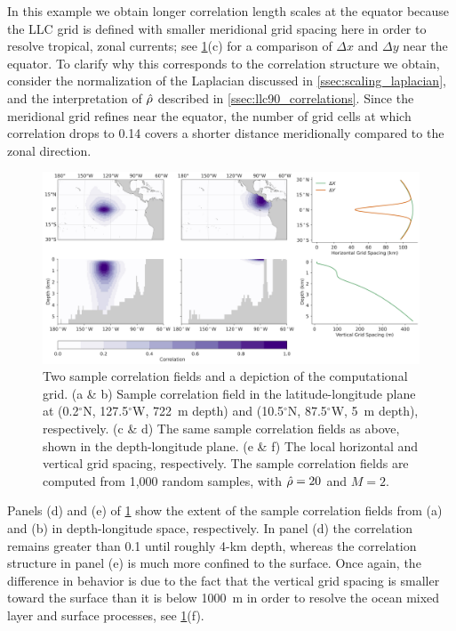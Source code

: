 In this example we obtain longer correlation length scales at the equator
because the LLC grid is defined with smaller meridional grid spacing here in
order to resolve tropical, zonal currents;
see \cref{fig:llc90_correlation_maps}(c) for a comparison of $\Delta x $ and
$\Delta y$ near the equator.
To clarify why this corresponds to the correlation structure we obtain,
consider the normalization of the Laplacian discussed in
\cref{ssec:scaling_laplacian}, and the interpretation of $\hat{\rho}$ described
in \cref{ssec:llc90_correlations}.
Since the meridional grid refines near the equator, the number of grid cells at
which correlation drops to 0.14 covers a shorter distance meridionally compared
to the zonal direction.

\begin{figure}
    \centering
    \includegraphics[width=\textwidth]{../figures/huge_correlation_map_02apps.jpg}
    \caption{Two sample correlation fields and a depiction of the computational
        grid.
        (a \& b) Sample correlation field in the latitude-longitude plane at
        (0.2$^\circ$N, 127.5$^\circ$W, 722~m depth) and
        (10.5$^\circ$N, 87.5$^\circ$W, 5~m depth), respectively.
        (c \& d) The same sample correlation fields as above, shown in the
        depth-longitude plane.
        (e \& f) The local horizontal and vertical grid spacing, respectively.
        The sample correlation fields are computed from 1,000 random samples,
        with $\hat{\rho} = 20$ and $M=2$.
    }
    \label{fig:llc90_correlation_maps}
\end{figure}

Panels (d) and (e) of \cref{fig:llc90_correlation_maps} show the extent of the
sample correlation fields from (a) and (b) in depth-longitude space, respectively.
In panel (d) the correlation remains greater than 0.1 until roughly 4-km
depth, whereas the correlation structure in panel (e) is much more confined to
the surface.
Once again, the difference in behavior is due to the fact that the vertical grid
spacing is smaller toward the surface than it is below 1000~m in order to
resolve the ocean mixed layer and surface processes, see
\cref{fig:llc90_correlation_maps}(f).

